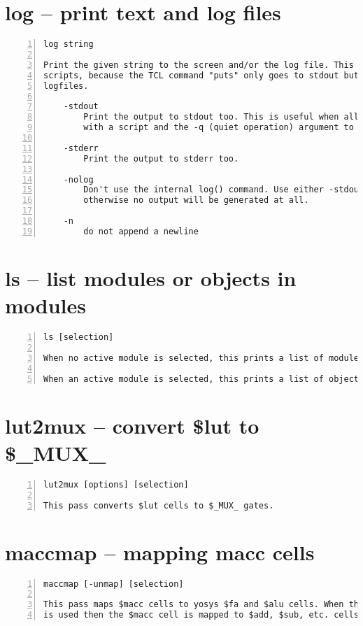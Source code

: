 \section{log -- print text and log files}
\label{cmd:log}
\begin{lstlisting}[numbers=left,frame=single]
    log string

Print the given string to the screen and/or the log file. This is useful for TCL
scripts, because the TCL command "puts" only goes to stdout but not to
logfiles.

    -stdout
        Print the output to stdout too. This is useful when all Yosys is executed
        with a script and the -q (quiet operation) argument to notify the user.

    -stderr
        Print the output to stderr too.

    -nolog
        Don't use the internal log() command. Use either -stdout or -stderr,
        otherwise no output will be generated at all.

    -n
        do not append a newline
\end{lstlisting}

\section{ls -- list modules or objects in modules}
\label{cmd:ls}
\begin{lstlisting}[numbers=left,frame=single]
    ls [selection]

When no active module is selected, this prints a list of modules.

When an active module is selected, this prints a list of objects in the module.
\end{lstlisting}

\section{lut2mux -- convert \$lut to \$\_MUX\_}
\label{cmd:lut2mux}
\begin{lstlisting}[numbers=left,frame=single]
    lut2mux [options] [selection]

This pass converts $lut cells to $_MUX_ gates.
\end{lstlisting}

\section{maccmap -- mapping macc cells}
\label{cmd:maccmap}
\begin{lstlisting}[numbers=left,frame=single]
    maccmap [-unmap] [selection]

This pass maps $macc cells to yosys $fa and $alu cells. When the -unmap option
is used then the $macc cell is mapped to $add, $sub, etc. cells instead.
\end{lstlisting}

